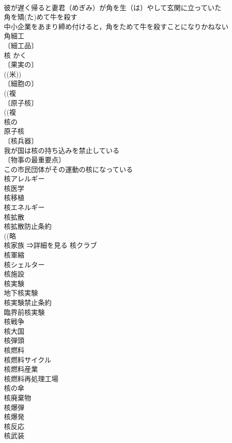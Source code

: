 \documentclass[8pt]{extreport}
\begin{document}
\begin{CJK}{UTF8}{min}
\\	彼が遅く帰ると妻君（めぎみ）が角を生（は）やして玄関に立っていた 
\\	角を矯(た)めて牛を殺す 
\\	中小企業をあまり締め付けると，角をためて牛を殺すことになりかねない 
\\	角細工 
\\	〔細工品〕
\\	核	かく	
\\	〔果実の〕
\\	((米)) 
\\	〔細胞の〕
\\	((複
\\	〔原子核〕
\\	((複
\\	核の 
\\	原子核 
\\	〔核兵器〕
\\	我が国は核の持ち込みを禁止している 
\\	〔物事の最重要点〕
\\	この市民団体がその運動の核になっている 
\\	核アレルギー 
\\	核医学 
\\	核移植 
\\	核エネルギー 
\\	核拡散 
\\	核拡散防止条約 
\\	((略
\\	核家族 ⇒詳細を見る 核クラブ 
\\	核軍縮 
\\	核シェルター 
\\	核施設 
\\	核実験 
\\	地下核実験 
\\	核実験禁止条約 
\\	臨界前核実験 
\\	核戦争 
\\	核大国 
\\	核弾頭 
\\	核燃料 
\\	核燃料サイクル 
\\	核燃料産業 
\\	核燃料再処理工場 
\\	核の傘 
\\	核廃棄物 
\\	核爆弾 
\\	核爆発 
\\	核反応 
\\	核武装 

\end{CJK}
\end{document}
